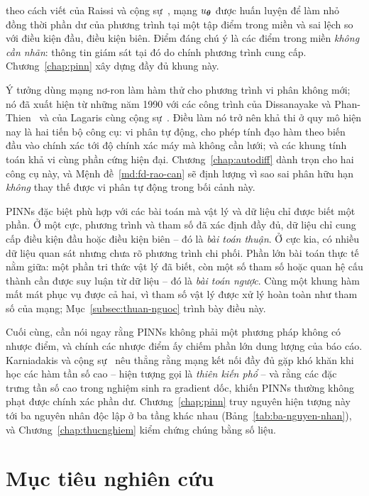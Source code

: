 theo cách viết của Raissi và cộng sự~\cite{raissi2019}, mạng $u_{\bm{\theta}}$ được
huấn luyện để làm nhỏ đồng thời phần dư của phương trình tại một tập điểm trong
miền và sai lệch so với điều kiện đầu, điều kiện biên. Điểm đáng chú ý là các
điểm trong miền \emph{không cần nhãn}: thông tin giám sát tại đó do chính phương
trình cung cấp. Chương~\ref{chap:pinn} xây dựng đầy đủ khung này.
 
Ý tưởng dùng mạng nơ-ron làm hàm thử cho phương trình vi phân không mới; nó đã
xuất hiện từ những năm 1990 với các công trình của Dissanayake và
Phan-Thien~\cite{dissanayake1994} và của Lagaris cùng cộng sự~\cite{lagaris1998}.
Điều làm nó trở nên khả thi ở quy mô hiện nay là hai tiến bộ công cụ: vi phân tự
động, cho phép tính đạo hàm theo biến đầu vào chính xác tới độ chính xác máy mà
không cần lưới; và các khung tính toán khả vi cùng phần cứng hiện đại.
Chương~\ref{chap:autodiff} dành trọn cho hai công cụ này, và
Mệnh đề~\ref{md:fd-rao-can} sẽ định lượng vì sao sai phân hữu hạn \emph{không}
thay thế được vi phân tự động trong bối cảnh này.
 
PINNs đặc biệt phù hợp với các bài toán mà vật lý và dữ liệu chỉ được biết một
phần. Ở một cực, phương trình và tham số đã xác định đầy đủ, dữ liệu chỉ cung cấp
điều kiện đầu hoặc điều kiện biên -- đó là \emph{bài toán thuận}. Ở cực kia, có
nhiều dữ liệu quan sát nhưng chưa rõ phương trình chi phối. Phần lớn bài toán thực
tế nằm giữa: một phần tri thức vật lý đã biết, còn một số tham số hoặc quan hệ cấu
thành cần được suy luận từ dữ liệu -- đó là \emph{bài toán ngược}. Cùng một khung
hàm mất mát phục vụ được cả hai, vì tham số vật lý được xử lý hoàn toàn như tham
số của mạng; Mục~\ref{subsec:thuan-nguoc} trình bày điều này.
 
Cuối cùng, cần nói ngay rằng PINNs không phải một phương pháp không có nhược điểm,
và chính các nhược điểm ấy chiếm phần lớn dung lượng của báo cáo. Karniadakis và
cộng sự~\cite{karniadakis2021} nêu thẳng rằng mạng kết nối đầy đủ gặp khó khăn khi
học các hàm tần số cao -- hiện tượng gọi là \emph{thiên kiến phổ} -- và rằng các
đặc trưng tần số cao trong nghiệm sinh ra gradient dốc, khiến PINNs thường không
phạt được chính xác phần dư. Chương~\ref{chap:pinn} truy nguyên hiện tượng này tới
ba nguyên nhân độc lập ở ba tầng khác nhau (Bảng~\ref{tab:ba-nguyen-nhan}), và
Chương~\ref{chap:thucnghiem} kiểm chứng chúng bằng số liệu.
 
\section{Mục tiêu nghiên cứu}
\label{sec:muc-tieu}
 
